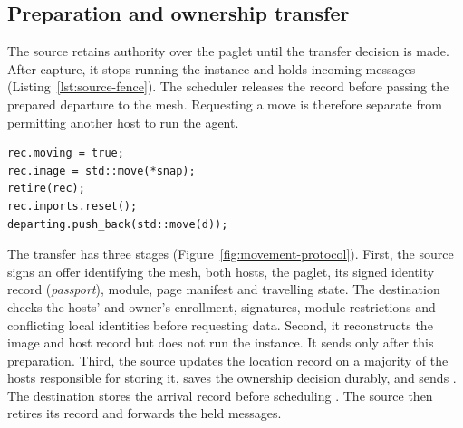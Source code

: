 \subsection{Preparation and ownership transfer}\label{sec:movement-protocol}

The source retains authority over the paglet until the transfer decision
is made. After capture, it stops running the instance and holds incoming
messages (Listing~\ref{lst:source-fence}). The scheduler releases the
record before passing the prepared departure to the mesh. Requesting a
move is therefore separate from permitting another host to run the agent.

\begin{lstlisting}[style=paglets-cpp,caption={Stopping source execution before announcing departure \src{cpp/host/src/runtime.cpp}},label={lst:source-fence}]
rec.moving = true;
rec.image = std::move(*snap);
retire(rec);
rec.imports.reset();
departing.push_back(std::move(d));
\end{lstlisting}

The transfer has three stages (Figure~\ref{fig:movement-protocol}).
First, the source signs an offer identifying the mesh, both hosts, the
paglet, its signed identity record (\emph{passport}), module, page manifest
and travelling state. The destination checks the hosts' and owner's
enrollment, signatures, module restrictions and conflicting local
identities before requesting data. Second, it reconstructs the image
and host record but does not run the instance. It sends 
only after this preparation. Third, the source updates the location
record on a majority of the hosts responsible for storing it, saves the
ownership decision durably, and sends . The destination
stores the arrival record before scheduling . The source
then retires its record and forwards the held messages.

